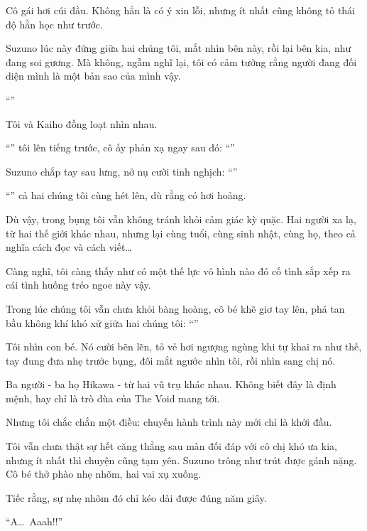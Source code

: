 \documentclass[../main.tex]{subfiles}
\begin{document}
Cô gái hơi cúi đầu. Không hẳn là có ý xin lỗi, nhưng ít nhất cũng không tỏ thái độ hằn học như trước.

Suzuno lúc này đứng giữa hai chúng tôi, mắt nhìn bên này, rồi lại bên kia, như đang soi gương. Mà không, ngẫm nghĩ lại, tôi có cảm tưởng rằng người đang đối diện mình là một bản sao của mình vậy.

``''

Tôi và Kaiho đồng loạt nhìn nhau.

``'' tôi lên tiếng trước, cô ấy phản xạ ngay sau đó: ``''

Suzuno chắp tay sau lưng, nở nụ cười tinh nghịch: ``''

``'' cả hai chúng tôi cùng hét lên, dù rằng có hơi hoảng.

Dù vậy, trong bụng tôi vẫn không tránh khỏi cảm giác kỳ quặc. Hai người xa lạ, từ hai thế giới khác nhau, nhưng lại cùng tuổi, cùng sinh nhật, cùng họ, theo cả nghĩa cách đọc và cách viết\dots

Càng nghĩ, tôi càng thấy như có một thế lực vô hình nào đó cố tình sắp xếp ra cái tình huống tréo ngoe này vậy.

Trong lúc chúng tôi vẫn chưa khỏi bàng hoàng, cô bé khẽ giơ tay lên, phá tan bầu không khí khó xử giữa hai chúng tôi: ``''

Tôi nhìn con bé. Nó cười bẽn lẽn, tỏ vẻ hơi ngượng ngùng khi tự khai ra như thế, tay đung đưa nhẹ trước bụng, đôi mắt ngước nhìn tôi, rồi nhìn sang chị nó.

Ba người - ba họ Hikawa - từ hai vũ trụ khác nhau. Không biết đây là định mệnh, hay chỉ là trò đùa của The Void mang tới.

Nhưng tôi chắc chắn một điều: chuyến hành trình này mới chỉ là khởi đầu.

\il

Tôi vẫn chưa thật sự hết căng thẳng sau màn đối đáp với cô chị khó ưa kia, nhưng ít nhất thì chuyện cũng tạm yên. Suzuno trông như trút được gánh nặng. Cô bé thở phào nhẹ nhõm, hai vai xụ xuống.

Tiếc rằng, sự nhẹ nhõm đó chỉ kéo dài được đúng năm giây.

``A\dots\ Aaah!!''
\end{document}
